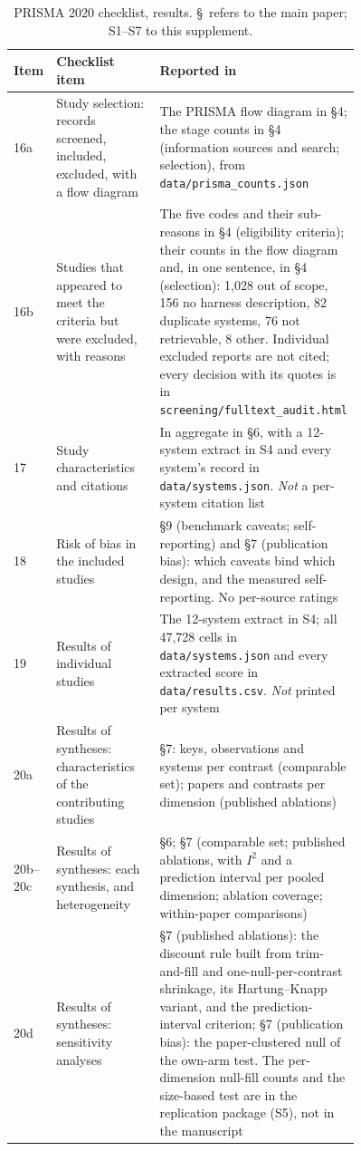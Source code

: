\begin{table}[htbp]
\caption{PRISMA 2020 checklist, results. \S\ refers to the main paper; S1--S7 to this supplement.}
\label{tab:prisma-results}
\footnotesize
\begin{tabular}{@{}l p{0.36\linewidth} p{0.40\linewidth}@{}}
\toprule
Item & Checklist item & Reported in \\
\midrule
16a & \raggedright Study selection: records screened, included, excluded, with a flow diagram & \raggedright The PRISMA flow diagram in \S4; the stage counts in \S4 (information sources and search; selection), from \texttt{data/prisma\_counts.json} \tabularnewline
16b & \raggedright Studies that appeared to meet the criteria but were excluded, with reasons & \raggedright The five codes and their sub-reasons in \S4 (eligibility criteria); their counts in the flow diagram and, in one sentence, in \S4 (selection): 1,028 out of scope, 156 no harness description, 82 duplicate systems, 76 not retrievable, 8 other. Individual excluded reports are not cited; every decision with its quotes is in \texttt{screening/fulltext\_audit.html} \tabularnewline
17 & \raggedright Study characteristics and citations & \raggedright In aggregate in \S6, with a 12-system extract in S4 and every system's record in \texttt{data/systems.json}. \emph{Not} a per-system citation list \tabularnewline
18 & \raggedright Risk of bias in the included studies & \raggedright \S9 (benchmark caveats; self-reporting) and \S7 (publication bias): which caveats bind which design, and the measured self-reporting. No per-source ratings \tabularnewline
19 & \raggedright Results of individual studies & \raggedright The 12-system extract in S4; all 47,728 cells in \texttt{data/systems.json} and every extracted score in \texttt{data/results.csv}. \emph{Not} printed per system \tabularnewline
20a & \raggedright Results of syntheses: characteristics of the contributing studies & \raggedright \S7: keys, observations and systems per contrast (comparable set); papers and contrasts per dimension (published ablations) \tabularnewline
20b--20c & \raggedright Results of syntheses: each synthesis, and heterogeneity & \raggedright \S6; \S7 (comparable set; published ablations, with $I^2$ and a prediction interval per pooled dimension; ablation coverage; within-paper comparisons) \tabularnewline
20d & \raggedright Results of syntheses: sensitivity analyses & \raggedright \S7 (published ablations): the discount rule built from trim-and-fill and one-null-per-contrast shrinkage, its Hartung--Knapp variant, and the prediction-interval criterion; \S7 (publication bias): the paper-clustered null of the own-arm test. The per-dimension null-fill counts and the size-based test are in the replication package (S5), not in the manuscript \tabularnewline

\end{tabular}
\end{table}
